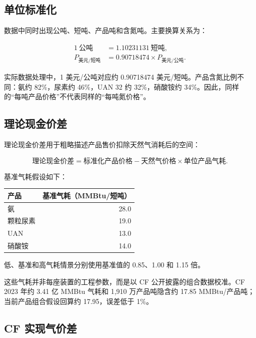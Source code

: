 \documentclass[11pt,a4paper]{ctexart}
\begin{document}
\subsection{单位标准化}

数据中同时出现公吨、短吨、产品吨和含氮吨。主要换算关系为：

\begin{align*}
1\ \text{公吨} &= 1.10231131\ \text{短吨}, \\
P_{\text{美元/短吨}} &= 0.90718474\times P_{\text{美元/公吨}}.
\end{align*}

实际数据处理中，1 美元/公吨对应约 0.90718474 美元/短吨。产品含氮比例不同：氨约 82\%，尿素约 46\%，UAN 32 约 32\%，硝酸铵约 34\%。因此，同样的“每吨产品价格”不代表同样的“每吨氮价格”。

\subsection{理论现金价差}

理论现金价差用于粗略描述产品售价扣除天然气消耗后的空间：

\begin{equation*}
\text{理论现金价差}
=\text{标准化产品价格}
-\text{天然气价格}\times\text{单位产品气耗}.
\end{equation*}

基准气耗假设如下：

\begin{center}
\begin{tabular}{l r}
\toprule
产品 & 基准气耗（MMBtu/短吨） \\
\midrule
氨 & 28.0 \\
颗粒尿素 & 19.0 \\
UAN & 13.0 \\
硝酸铵 & 14.0 \\
\bottomrule
\end{tabular}
\end{center}

低、基准和高气耗情景分别使用基准值的 0.85、1.00 和 1.15 倍。

这些气耗并非每座装置的工程参数，而是以 CF 公开披露的组合数据校准。CF 2023 年约 3.41 亿 MMBtu 气耗和 1,910 万产品吨隐含约 17.85 MMBtu/产品吨；当前产品组合假设回算约 17.95，误差低于 1\%。

\subsection{CF 实现气价差}
\end{document}
